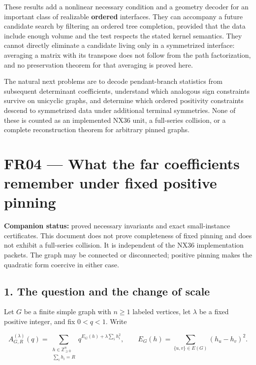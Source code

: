 \documentclass[
  11pt,
  a4paper,
]{report}
\begin{document}
These results add a nonlinear necessary condition and a geometry decoder
for an important class of realizable \textbf{ordered} interfaces. They
can accompany a future candidate search by filtering an ordered tree
completion, provided that the data include enough volume and the test
respects the stated kernel semantics. They cannot directly eliminate a
candidate living only in a symmetrized interface: averaging a matrix
with its transpose does not follow from the path factorization, and no
preservation theorem for that averaging is proved here.

The natural next problems are to decode pendant-branch statistics from
subsequent determinant coefficients, understand which analogous sign
constraints survive on unicyclic graphs, and determine which ordered
positivity constraints descend to symmetrized data under additional
terminal symmetries. None of these is counted as an implemented NX36
unit, a full-series collision, or a complete reconstruction theorem for
arbitrary pinned graphs.

\hypertarget{fr04-what-the-far-coefficients-remember-under-fixed-positive-pinning}{%
\chapter{FR04 --- What the far coefficients remember under fixed
positive
pinning}\label{fr04-what-the-far-coefficients-remember-under-fixed-positive-pinning}}

\textbf{Companion status:} proved necessary invariants and exact
small-instance certificates. This document does not prove completeness
of fixed pinning and does not exhibit a full-series collision. It is
independent of the NX36 implementation packets. The graph may be
connected or disconnected; positive pinning makes the quadratic form
coercive in either case.

\hypertarget{the-question-and-the-change-of-scale}{%
\section{1. The question and the change of
scale}\label{the-question-and-the-change-of-scale}}

Let \(G\) be a finite simple graph with \(n\ge1\) labeled vertices, let
\(\lambda\) be a fixed positive integer, and fix \(0<q<1\). Write

\[
 A_{G,R}^{(\lambda)}(q)
 =\sum_{\substack{h\in\mathbb Z_{\ge0}^{n}\\\sum_i h_i=R}}
 q^{E_G(h)+\lambda\sum_i h_i^2},
 \qquad
 E_G(h)=\sum_{\{u,v\}\in E(G)}(h_u-h_v)^2.
\]
\end{document}
